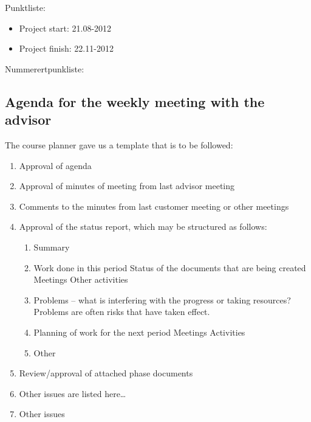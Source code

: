 Punktliste:
\begin{itemize}
\item{}Project start: 21.08-2012
\item{}Project finish: 22.11-2012
\end{itemize}

Nummerertpunkliste:
\subsection{Agenda for the weekly meeting with the advisor}
The course planner gave us a template that is to be followed:
\begin{enumerate}
\item{}Approval of agenda
\item{}Approval of minutes of meeting from last advisor meeting
\item{}Comments to the minutes from last customer meeting or other meetings
\item{}Approval of the status report, which may be structured as follows:
\begin{enumerate}
\item{}Summary
\item{}Work done in this period
\subitem{}Status of the documents that are being created
\subitem{}Meetings
\subitem{}Other activities
\item{}Problems – what is interfering with the progress or taking resources? Problems are often risks that have taken effect.
\item{}Planning of work for the next period
\subitem{}Meetings
\subitem{}Activities
\item{}Other
\end{enumerate}
\item{}Review/approval of attached phase documents
\item{}Other issues are listed here…
\item{}Other issues
\end{enumerate}
